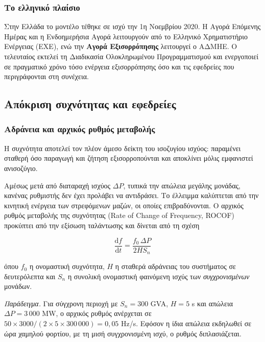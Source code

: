 \subsubsection*{Το ελληνικό πλαίσιο}

Στην Ελλάδα το μοντέλο τέθηκε σε ισχύ την 1η Νοεμβρίου 2020. Η Αγορά Επόμενης Ημέρας και η
Ενδοημερήσια Αγορά λειτουργούν από το Ελληνικό Χρηματιστήριο Ενέργειας (ΕΧΕ), ενώ την
\textbf{Αγορά Εξισορρόπησης} λειτουργεί ο ΑΔΜΗΕ. Ο τελευταίος εκτελεί τη Διαδικασία
Ολοκληρωμένου Προγραμματισμού και ενεργοποιεί σε πραγματικό χρόνο τόσο ενέργεια
εξισορρόπησης όσο και τις εφεδρείες που περιγράφονται στη συνέχεια.

\subsection{Απόκριση συχνότητας και εφεδρείες}

\subsubsection*{Αδράνεια και αρχικός ρυθμός μεταβολής}

Η συχνότητα αποτελεί τον πλέον άμεσο δείκτη του ισοζυγίου ισχύος: παραμένει σταθερή όσο
παραγωγή και ζήτηση εξισορροπούνται και αποκλίνει μόλις εμφανιστεί ανισοζύγιο.

Αμέσως μετά από διαταραχή ισχύος $\Delta P$, τυπικά την απώλεια μεγάλης μονάδας, κανένας
ρυθμιστής δεν έχει προλάβει να αντιδράσει. Το έλλειμμα καλύπτεται από την κινητική ενέργεια
των στρεφόμενων μαζών, οι οποίες επιβραδύνονται. Ο αρχικός ρυθμός μεταβολής της συχνότητας
(Rate of Change of Frequency, ROCOF) προκύπτει από την εξίσωση ταλάντωσης και δίνεται από
τη σχέση

\begin{equation}
\frac{\mathrm{d}f}{\mathrm{d}t} = \frac{f_0 \, \Delta P}{2 H S_n}
\label{eq:rocof}
\end{equation}

όπου $f_0$ η ονομαστική συχνότητα, $H$ η σταθερά αδράνειας του συστήματος σε δευτερόλεπτα
και $S_n$ η συνολική ονομαστική φαινόμενη ισχύς των \emph{συγχρονισμένων} μονάδων.

\emph{Παράδειγμα.} Για σύγχρονη περιοχή με $S_n = 300$ GVA, $H = 5$ s και απώλεια
$\Delta P = 3\,000$ MW, ο αρχικός ρυθμός ανέρχεται σε
$50 \times 3000 / (2 \times 5 \times 300\,000) = 0{,}05$ Hz/s. Εφόσον η ίδια απώλεια
εκδηλωθεί σε ώρα χαμηλού φορτίου, με τη μισή συγχρονισμένη ισχύ, ο ρυθμός διπλασιάζεται.

